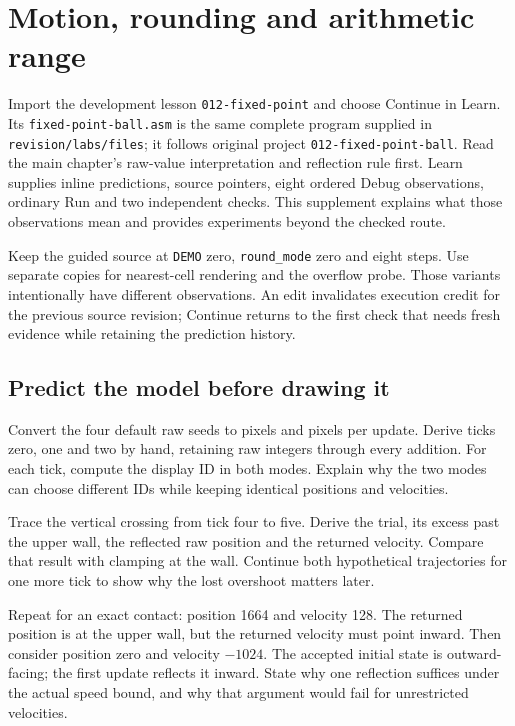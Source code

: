 \chapter{Motion, rounding and arithmetic range}
\label{revision-lab:fixed-point}

Import the development lesson \texttt{012-fixed-point} and choose Continue
in Learn. Its \texttt{fixed-point-ball.asm} is the same complete program supplied
in \texttt{revision/labs/files}; it follows original project
\texttt{012-fixed-point-ball}. Read the main chapter's raw-value interpretation
and reflection rule first. Learn supplies inline predictions, source pointers,
eight ordered Debug observations, ordinary Run and two independent checks.
This supplement explains what those observations mean and provides experiments
beyond the checked route.

Keep the guided source at \texttt{DEMO} zero, \texttt{round\_mode} zero and eight
steps. Use separate copies for nearest-cell rendering and the overflow probe.
Those variants intentionally have different observations. An edit invalidates
execution credit for the previous source revision; Continue returns to the
first check that needs fresh evidence while retaining the prediction history.

\section{Predict the model before drawing it}

Convert the four default raw seeds to pixels and pixels per update. Derive ticks
zero, one and two by hand, retaining raw integers through every addition. For each
tick, compute the display ID in both modes. Explain why the two modes can choose
different IDs while keeping identical positions and velocities.

Trace the vertical crossing from tick four to five. Derive the trial, its excess
past the upper wall, the reflected raw position and the returned velocity. Compare
that result with clamping at the wall. Continue both hypothetical trajectories for
one more tick to show why the lost overshoot matters later.

Repeat for an exact contact: position 1664 and velocity 128. The returned position
is at the upper wall, but the returned velocity must point inward. Then consider
position zero and velocity $-1024$. The accepted initial state is outward-facing;
the first update reflects it inward. State why one reflection suffices under the
actual speed bound, and why that argument would fail for unrestricted velocities.


